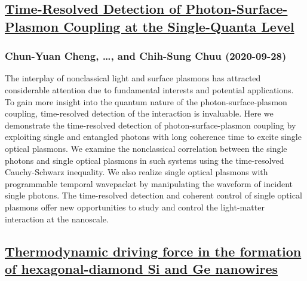 \subsection*{\href{http://arxiv.org/abs/2009.13652v1}{Time-Resolved Detection of Photon-Surface-Plasmon Coupling at the  Single-Quanta Level}}
\subsubsection*{Chun-Yuan Cheng, \dots, and Chih-Sung Chuu (2020-09-28)}
The interplay of nonclassical light and surface plasmons has attracted
considerable attention due to fundamental interests and potential applications.
To gain more insight into the quantum nature of the photon-surface-plasmon
coupling, time-resolved detection of the interaction is invaluable. Here we
demonstrate the time-resolved detection of photon-surface-plasmon coupling by
exploiting single and entangled photons with long coherence time to excite
single optical plasmons. We examine the nonclassical correlation between the
single photons and single optical plasmons in such systems using the
time-resolved Cauchy-Schwarz inequality. We also realize single optical
plasmons with programmable temporal wavepacket by manipulating the waveform of
incident single photons. The time-resolved detection and coherent control of
single optical plasmons offer new opportunities to study and control the
light-matter interaction at the nanoscale.

\subsection*{\href{http://arxiv.org/abs/2009.13630v1}{Thermodynamic driving force in the formation of hexagonal-diamond Si and  Ge nanowires}}
